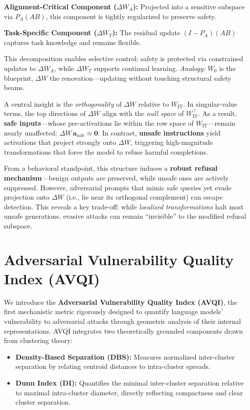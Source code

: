 \textbf{Alignment-Critical Component (\(\Delta W_A\)):} Projected into a sensitive subspace via \(P_A(AB)\), this component is tightly regularized to preserve safety.

\textbf{Task-Specific Component (\(\Delta W_T\)):} The residual update \((I - P_A)(AB)\) captures task knowledge and remains flexible.

This decomposition enables selective control: safety is protected via constrained updates to \(\Delta W_A\), while \(\Delta W_T\) supports continual learning. \textit{Analogy:} \(W_0\) is the blueprint, \(\Delta W\) the renovation—updating without touching structural safety beams.


A central insight is the \emph{orthogonality} of \(\Delta W\) relative to \(W_{\mathrm{IT}}\). In singular-value terms, the top directions of \(\Delta W\) align with the \emph{null space} of \(W_{\mathrm{IT}}^\top\). As a result, \textbf{safe inputs}—whose pre-activations lie within the row space of \(W_{\mathrm{IT}}\)—remain nearly unaffected: \(\Delta W\,\mathbf{a}_{\mathrm{safe}} \approx \mathbf{0}\). In contrast, \textbf{unsafe instructions} yield activations that project strongly onto \(\Delta W\), triggering high-magnitude transformations that force the model to refuse harmful completions.

From a behavioral standpoint, this structure induces a \textbf{robust refusal mechanism}—benign outputs are preserved, while unsafe ones are actively suppressed. However, adversarial prompts that mimic safe queries yet evade projection onto \(\Delta W\) (i.e., lie near its orthogonal complement) can escape detection. This reveals a key trade-off: while \emph{localized transformations} halt most unsafe generations, evasive attacks can remain ``invisible'' to the modified refusal subspace.



\section{Adversarial Vulnerability Quality Index (AVQI)}
\label{sec:avqi}

We introduce the \textbf{Adversarial Vulnerability Quality Index (AVQI)}, the first mechanistic metric rigorously designed to quantify language models' vulnerability to adversarial attacks through geometric analysis of their internal representations. AVQI integrates two theoretically grounded components drawn from clustering theory:

\begin{itemize}
    \item \textbf{Density-Based Separation (DBS):} Measures normalized inter-cluster separation by relating centroid distances to intra-cluster spreads.
    \item \textbf{Dunn Index (DI):} Quantifies the minimal inter-cluster separation relative to maximal intra-cluster diameter, directly reflecting compactness and clear cluster separation.
\end{itemize}

